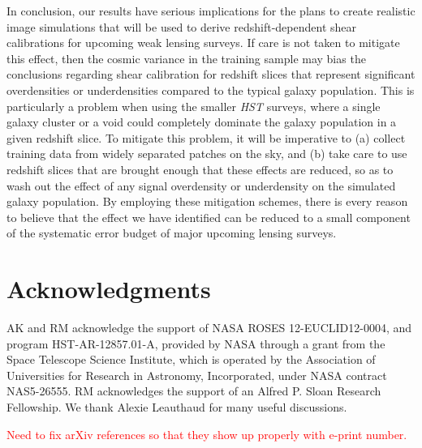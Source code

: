 \documentclass[twocolumn,useAMS,usenatbib]{mn2e}
\newcommand{\rachel}[1]{{\textcolor{red}{#1}}}
\begin{document}
In conclusion, our results have serious implications for the plans to
create realistic image simulations that will be used to derive
redshift-dependent shear calibrations for upcoming weak lensing
surveys.  If care is not taken to mitigate this effect, then the
cosmic variance in the training sample may bias the conclusions
regarding shear calibration for redshift slices that represent
significant overdensities or underdensities compared to the typical
galaxy population.  This is particularly a problem when using the
smaller {\em HST} surveys, where a single galaxy cluster or a void
could completely dominate the galaxy population in a given redshift
slice.  To mitigate this problem, it will be imperative to (a) collect
training data from widely separated patches on the sky, and (b) take
care to use redshift slices that are brought enough that these effects
are reduced, so as to wash out the effect of any signal overdensity or
underdensity on the simulated galaxy population.  By employing these
mitigation schemes, there is every reason to believe that the effect
we have identified can be reduced to a small component of the
systematic error budget of major upcoming lensing surveys.


\section*{Acknowledgments}

AK and RM acknowledge the support of NASA ROSES 12-EUCLID12-0004, and
program HST-AR-12857.01-A, provided by NASA through a grant from the
Space Telescope Science Institute, which is operated by the
Association of Universities for Research in Astronomy, Incorporated,
under NASA contract NAS5-26555. RM acknowledges the support of an Alfred P. Sloan Research Fellowship.  We thank Alexie Leauthaud for 
many useful discussions.

\rachel{Need to fix arXiv references so that they show up properly
  with e-print number.}


\end{document}
